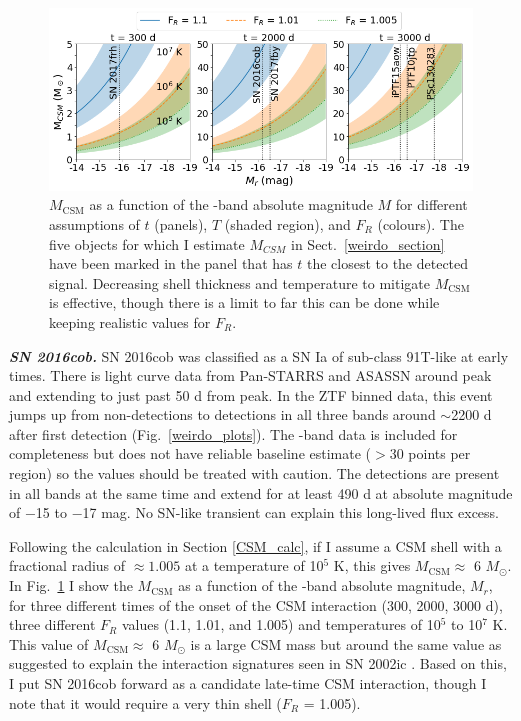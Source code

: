 \documentclass[a4paper,oneside,12pt, class=Latex/Classes/PhDthesisPSnPDF, crop=false]{standalone}
\begin{document}
\begin{figure}
    \centering
    \includegraphics[width=16cm]{../Images/chapter_4/M_MCSM_rel.png}
    \caption{$M_\text{CSM}$ as a function of the \ztfr-band absolute magnitude $M$ for different assumptions of $t$ (panels), $T$ (shaded region), and $F_R$ (colours). The five objects for which I estimate $M_{CSM}$ in Sect.~\ref{weirdo_section} have been marked in the panel that has $t$ the closest to the detected signal. Decreasing shell thickness and temperature to mitigate $M_\text{CSM}$ is effective, though there is a limit to far this can be done while keeping realistic values for $F_R$.}
    \label{M_CMS_fig}
\end{figure}


\textit{\textbf{SN 2016cob.}}
SN 2016cob was classified as a SN Ia of sub-class 91T-like at early times. There is light curve data from Pan-STARRS and ASASSN around peak and extending to just past 50 d from peak. In the ZTF binned data, this event jumps up from non-detections to detections in all three bands around $\sim$2200 d after first detection (Fig.~\ref{weirdo_plots}). The \ztfi-band data is included for completeness but does not have reliable baseline estimate ($>$30 points per region) so the values should be treated with caution. The detections are present in all bands at the same time and extend for at least 490 d at absolute magnitude of $-$15 to $-$17 mag. No SN-like transient can explain this long-lived flux excess.

Following the calculation in Section \ref{CSM_calc}, if I assume a CSM shell with a fractional radius of $\approx 1.005$ at a temperature of 10$^5$ K, this gives $M_\text{CSM}\approx$ 6 $M_\odot$. In Fig.~\ref{M_CMS_fig} I show the $M_\text{CSM}$ as a function of the \ztfr-band absolute magnitude, $M_r$, for three different times of the onset of the CSM interaction (300, 2000, 3000 d), three different $F_R$ values (1.1, 1.01, and 1.005) and temperatures of 10$^5$ to 10$^7$ K. This value of $M_\text{CSM}\approx$ 6 $M_\odot$ is a large CSM mass but around the same value as suggested to explain the interaction signatures seen in SN 2002ic \citep{Hamuy_02ic}. Based on this, I put SN 2016cob forward as a candidate late-time CSM interaction, though I note that it would require a very thin shell ($F_R$ = 1.005).
\end{document}
